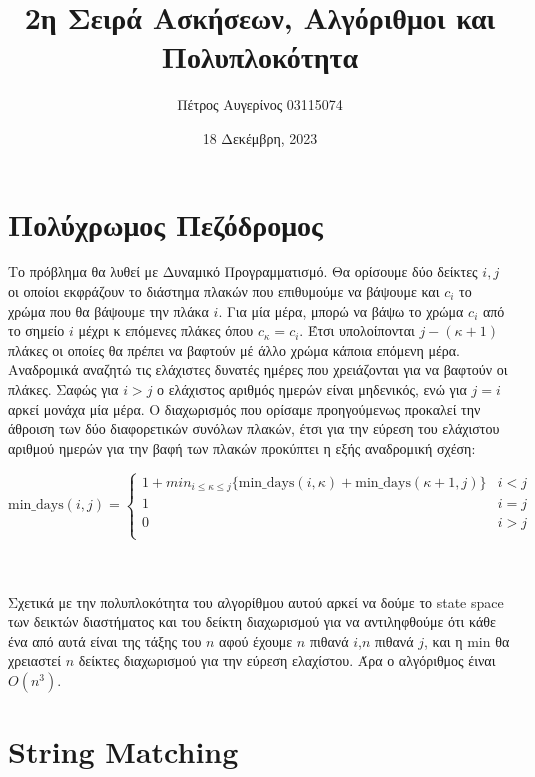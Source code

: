 \documentclass{article}
\title{2η Σειρά Ασκήσεων, Αλγόριθμοι και Πολυπλοκότητα}
\author{Πέτρος Αυγερίνος 03115074}
\date{18 Δεκέμβρη, 2023}
\begin{document}
\maketitle
\tableofcontents
\pagebreak

\section{Πολύχρωμος Πεζόδρομος}
Το πρόβλημα θα λυθεί με Δυναμικό Προγραμματισμό. Θα ορίσουμε δύο δείκτες $i,j$ οι οποίοι
εκφράζουν το διάστημα πλακών που επιθυμούμε να βάψουμε και $c_i$ το χρώμα που θα βάψουμε την
πλάκα $i$. Για μία μέρα, μπορώ να βάψω το χρώμα $c_i$ από το σημείο $i$ μέχρι κ επόμενες 
πλάκες όπου $c_κ = c_i$. Έτσι υπολοίπονται $j-(κ+1)$ πλάκες οι οποίες θα πρέπει να βαφτούν μέ άλλο
χρώμα κάποια επόμενη μέρα. Αναδρομικά αναζητώ τις ελάχιστες δυνατές ημέρες που χρειάζονται 
για να βαφτούν οι πλάκες. Σαφώς για $i > j$ ο ελάχιστος αριθμός ημερών είναι μηδενικός, ενώ
για $j = i$ αρκεί μονάχα μία μέρα. Ο διαχωρισμός που ορίσαμε προηγούμενως προκαλεί την άθροιση
των δύο διαφορετικών συνόλων πλακών, έτσι για την εύρεση του ελάχιστου αριθμού ημερών για την
βαφή των πλακών προκύπτει η εξής αναδρομική σχέση: \\ \break
\begin{center}
$
\text{min\_days}(i,j) =
\begin{cases}
    1+min_{i \le κ \le j}\{\text{min\_days}(i,κ) + \text{min\_days}(κ+1,j)\} & i < j\\
    1 & i = j\\
    0 & i > j \\
\end{cases}
$
\end{center} \\ \\

Σχετικά με την πολυπλοκότητα του αλγορίθμου αυτού αρκεί να δούμε το state space των δεικτών διαστήματος 
και του δείκτη διαχωρισμού για να αντιληφθούμε ότι κάθε ένα από αυτά είναι της τάξης του $n$ αφού 
έχουμε $n$ πιθανά $i$,$n$ πιθανά $j$, και η min θα χρειαστεί $n$ δείκτες διαχωρισμού για την εύρεση 
ελαχίστου. Άρα ο αλγόριθμος έιναι $O(n^3)$.


\pagebreak
\section{String Matching}
\end{document}
